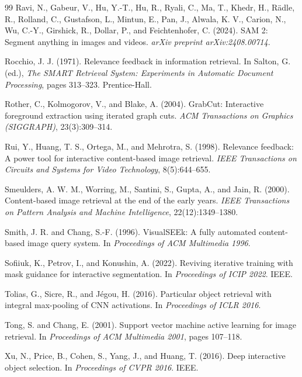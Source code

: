 \documentclass[12pt,a4paper]{article}
\begin{document}
\begin{thebibliography}{99}
Ravi, N., Gabeur, V., Hu, Y.-T., Hu, R., Ryali, C., Ma, T., Khedr, H., R{\"a}dle, R.,
Rolland, C., Gustafson, L., Mintun, E., Pan, J., Alwala, K. V., Carion, N.,
Wu, C.-Y., Girshick, R., Dollar, P., and Feichtenhofer, C. (2024).
SAM 2: Segment anything in images and videos.
\emph{arXiv preprint arXiv:2408.00714}.

Rocchio, J. J. (1971).
Relevance feedback in information retrieval.
In Salton, G. (ed.), \emph{The SMART Retrieval System: Experiments in Automatic
Document Processing}, pages 313--323. Prentice-Hall.

Rother, C., Kolmogorov, V., and Blake, A. (2004).
GrabCut: Interactive foreground extraction using iterated graph cuts.
\emph{ACM Transactions on Graphics (SIGGRAPH)}, 23(3):309--314.

Rui, Y., Huang, T. S., Ortega, M., and Mehrotra, S. (1998).
Relevance feedback: A power tool for interactive content-based image retrieval.
\emph{IEEE Transactions on Circuits and Systems for Video Technology}, 8(5):644--655.

Smeulders, A. W. M., Worring, M., Santini, S., Gupta, A., and Jain, R. (2000).
Content-based image retrieval at the end of the early years.
\emph{IEEE Transactions on Pattern Analysis and Machine Intelligence}, 22(12):1349--1380.

Smith, J. R. and Chang, S.-F. (1996).
VisualSEEk: A fully automated content-based image query system.
In \emph{Proceedings of ACM Multimedia 1996}.

Sofiiuk, K., Petrov, I., and Konushin, A. (2022).
Reviving iterative training with mask guidance for interactive segmentation.
In \emph{Proceedings of ICIP 2022}. IEEE.

Tolias, G., Sicre, R., and Jégou, H. (2016).
Particular object retrieval with integral max-pooling of CNN activations.
In \emph{Proceedings of ICLR 2016}.

Tong, S. and Chang, E. (2001).
Support vector machine active learning for image retrieval.
In \emph{Proceedings of ACM Multimedia 2001}, pages 107--118.

Xu, N., Price, B., Cohen, S., Yang, J., and Huang, T. (2016).
Deep interactive object selection.
In \emph{Proceedings of CVPR 2016}. IEEE.


\end{thebibliography}
\end{document}
